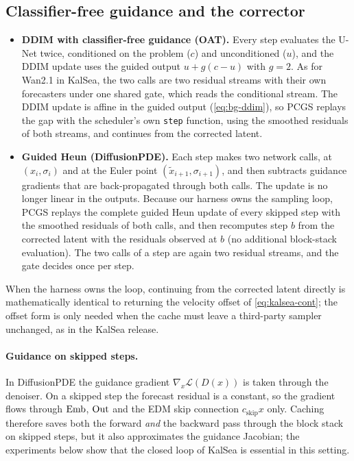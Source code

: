 \subsection{Classifier-free guidance and the corrector}
\begin{itemize}
  \item \textbf{DDIM with classifier-free guidance (OAT).} Every step evaluates the U-Net twice, conditioned on the problem ($c$) and unconditioned ($u$), and the DDIM update uses the guided output $u+g(c-u)$ with $g=2$. As for Wan2.1 in KalSea, the two calls are two residual streams with their own forecasters under one shared gate, which reads the conditional stream. The DDIM update is affine in the guided output (\cref{eq:bg-ddim}), so PCGS replays the gap with the scheduler's own \texttt{step} function, using the smoothed residuals of both streams, and continues from the corrected latent.
  \item \textbf{Guided Heun (DiffusionPDE).} Each step makes two network calls, at $(x_i,\sigma_i)$ and at the Euler point $(\tilde x_{i+1},\sigma_{i+1})$, and then subtracts guidance gradients that are back-propagated through both calls. The update is no longer linear in the outputs. Because our harness owns the sampling loop, PCGS replays the complete guided Heun update of every skipped step with the smoothed residuals of both calls, and then recomputes step $b$ from the corrected latent with the residuals observed at $b$ (no additional block-stack evaluation). The two calls of a step are again two residual streams, and the gate decides once per step.
\end{itemize}
When the harness owns the loop, continuing from the corrected latent directly is mathematically identical to returning the velocity offset of \cref{eq:kalsea-cont}; the offset form is only needed when the cache must leave a third-party sampler unchanged, as in the KalSea release.

\paragraph{Guidance on skipped steps.} In DiffusionPDE the guidance gradient $\nabla_{x}\mathcal L(D(x))$ is taken through the denoiser. On a skipped step the forecast residual is a constant, so the gradient flows through $\mathrm{Emb}$, $\mathrm{Out}$ and the EDM skip connection $c_{\mathrm{skip}}x$ only. Caching therefore saves both the forward \emph{and} the backward pass through the block stack on skipped steps, but it also approximates the guidance Jacobian; the experiments below show that the closed loop of KalSea is essential in this setting.


